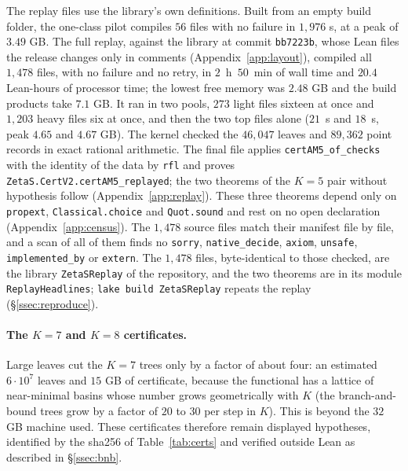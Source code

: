 The replay files use the library's own definitions. Built from an empty build folder, the one-class pilot compiles $56$ files with no
failure in $1{,}976$ s, at a peak of $3.49$ GB. The full replay, against the library at commit \texttt{bb7223b}, whose Lean files the release
changes only in comments (Appendix~\ref{app:layout}), compiled all $1{,}478$ files, with no failure and no retry, in $2$~h~$50$~min of
wall time and $20.4$ Lean-hours of processor time; the lowest free memory was $2.48$ GB and the build products take $7.1$ GB. It ran in two
pools, $273$ light files sixteen at once and $1{,}203$ heavy files six at once, and then the two top files alone ($21$~s and $18$~s, peak
$4.65$ and $4.67$ GB). The kernel checked the $46{,}047$ leaves and $89{,}362$ point records in exact rational arithmetic. The final file applies
\texttt{certAM5\_of\_checks} with the identity of the data by \texttt{rfl} and proves \texttt{ZetaS.CertV2.\allowbreak certAM5\_replayed};
the two theorems of the $K=5$ pair without hypothesis follow (Appendix~\ref{app:replay}). These three theorems
depend only on \texttt{propext}, \texttt{Classical.choice} and \texttt{Quot.sound} and rest on no open declaration (Appendix~\ref{app:census}). The $1{,}478$ source files
match their manifest file by file, and a scan of all of them finds no \texttt{sorry}, \texttt{native\_decide}, \texttt{axiom},
\texttt{unsafe}, \texttt{implemented\_by} or \texttt{extern}. The $1{,}478$ files, byte-identical to those checked, are the
library \texttt{ZetaSReplay} of the repository, and the two theorems are in its module \texttt{ReplayHeadlines}; \texttt{lake build
ZetaSReplay} repeats the replay (\S\ref{ssec:reproduce}).

\paragraph{The $K=7$ and $K=8$ certificates.} Large leaves cut the $K=7$ trees only by a factor of about four: an estimated $6\cdot10^7$ leaves and
$15$ GB of certificate, because the functional has a lattice of near-minimal basins whose number grows geometrically with $K$ (the branch-and-bound
trees grow by a factor of $20$ to $30$ per step in $K$). This is beyond the $32$ GB machine used. These certificates therefore remain displayed
hypotheses, identified by the sha256 of Table~\ref{tab:certs} and verified outside Lean as described in \S\ref{ssec:bnb}.

